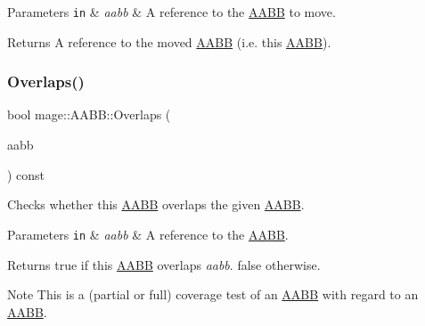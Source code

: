 \begin{DoxyParams}[1]{Parameters}
\mbox{\tt in}  & {\em aabb} & A reference to the \hyperlink{structmage_1_1_a_a_b_b}{A\+A\+BB} to move. \\
\hline
\end{DoxyParams}
\begin{DoxyReturn}{Returns}
A reference to the moved \hyperlink{structmage_1_1_a_a_b_b}{A\+A\+BB} (i.\+e. this \hyperlink{structmage_1_1_a_a_b_b}{A\+A\+BB}). 
\end{DoxyReturn}
\hypertarget{structmage_1_1_a_a_b_b_a0953268725119ef25651ab50ad3de658}{}\label{structmage_1_1_a_a_b_b_a0953268725119ef25651ab50ad3de658} 
\subsubsection{\texorpdfstring{Overlaps()}{Overlaps()}\hspace{0.1cm}{\footnotesize\ttfamily [1/2]}}
{\footnotesize\ttfamily bool mage\+::\+A\+A\+B\+B\+::\+Overlaps (\begin{DoxyParamCaption}\item[{const \hyperlink{structmage_1_1_a_a_b_b}{A\+A\+BB} \&}]{aabb }\end{DoxyParamCaption}) const\hspace{0.3cm}{\ttfamily [noexcept]}}

Checks whether this \hyperlink{structmage_1_1_a_a_b_b}{A\+A\+BB} overlaps the given \hyperlink{structmage_1_1_a_a_b_b}{A\+A\+BB}.


\begin{DoxyParams}[1]{Parameters}
\mbox{\tt in}  & {\em aabb} & A reference to the \hyperlink{structmage_1_1_a_a_b_b}{A\+A\+BB}. \\
\hline
\end{DoxyParams}
\begin{DoxyReturn}{Returns}
{\ttfamily true} if this \hyperlink{structmage_1_1_a_a_b_b}{A\+A\+BB} overlaps {\itshape aabb}. {\ttfamily false} otherwise. 
\end{DoxyReturn}
\begin{DoxyNote}{Note}
This is a (partial or full) coverage test of an \hyperlink{structmage_1_1_a_a_b_b}{A\+A\+BB} with regard to an \hyperlink{structmage_1_1_a_a_b_b}{A\+A\+BB}. 
\end{DoxyNote}
\hypertarget{structmage_1_1_a_a_b_b_ac105ff686890e3fbb36bb230c663bde9}{}\label{structmage_1_1_a_a_b_b_ac105ff686890e3fbb36bb230c663bde9} 
